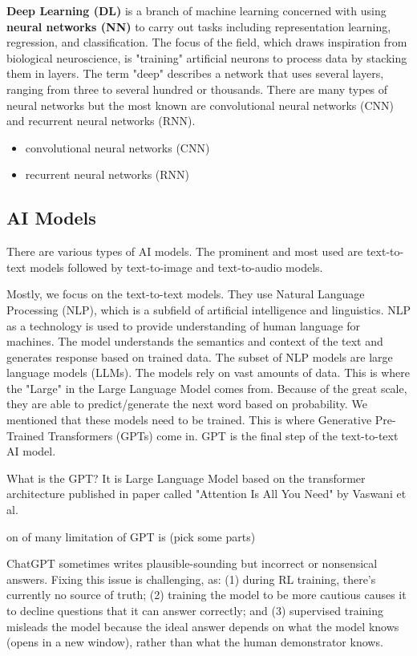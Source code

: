 \textbf{Deep Learning (DL)} is a branch of machine learning concerned with using \textbf{neural networks (NN)} to carry out tasks including representation learning, regression, and classification. The focus of the field, which draws inspiration from biological neuroscience, is "training" artificial neurons to process data by stacking them in layers. The term "deep" describes a network that uses several layers, ranging from three to several hundred or thousands\cite{LeCun2015}. There are many types of neural networks but the most known are convolutional neural networks (CNN) and recurrent neural networks (RNN).
\begin{itemize}
    \item convolutional neural networks (CNN)
    \item recurrent neural networks (RNN)
\end{itemize}



\subsection{AI Models}
There are various types of AI models. The prominent and most used are text-to-text models followed by text-to-image and text-to-audio models. 

Mostly, we focus on the text-to-text models. They use Natural Language Processing (NLP), which is a subfield of artificial intelligence and linguistics. NLP as a technology is used to provide understanding of human language for machines. The model understands the semantics and context of the text and generates response based on trained data. The subset of NLP models are large language models (LLMs). The models rely on vast amounts of data. This is where the "Large" in the Large Language Model comes from. Because of the great scale, they are able to predict/generate the next word based on probability. We mentioned that these models need to be trained. This is where Generative Pre-Trained Transformers (GPTs) come in. GPT is the final step of the text-to-text AI model. 

What is the GPT? It is Large Language Model based on the transformer architecture published in paper called "Attention Is All You Need" by Vaswani et al.\cite{vaswani2023attentionneed}


on of many limitation of GPT is (pick some parts)

ChatGPT sometimes writes plausible-sounding but incorrect or nonsensical answers. Fixing this issue is challenging, as: (1) during RL training, there’s currently no source of truth; (2) training the model to be more cautious causes it to decline questions that it can answer correctly; and (3) supervised training misleads the model because the ideal answer depends on what the model knows (opens in a new window), rather than what the human demonstrator knows.

